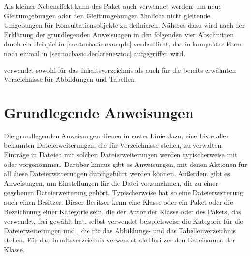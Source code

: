 Als kleiner Nebeneffekt kann das Paket auch verwendet werden, um neue
Gleitumgebungen oder den Gleitumgebungen ähnliche nicht gleitende Umgebungen
für Konsultationsobjekte zu definieren. Näheres dazu wird nach der Erklärung
der grundlegenden Anweisungen in den folgenden vier Abschnitten durch ein
Beispiel in \autoref{sec:tocbasic.example} verdeutlicht, das in kompakter Form
noch einmal in \autoref{sec:tocbasic.declarenewtoc} aufgegriffen wird.

\KOMAScript{} verwendet  sowohl für das Inhaltsverzeichnis
als auch für die bereits erwähnten Verzeichnisse für Abbildungen und Tabellen.


\section{Grundlegende Anweisungen}

Die grundlegenden Anweisungen dienen in erster Linie dazu, eine Liste aller
bekannten Dateierweiterungen, die für
Verzeichnisse stehen, zu verwalten. Einträge in Dateien mit solchen
Dateierweiterungen werden typischerweise mit
 oder
 vorgenommen. Darüber hinaus gibt es
Anweisungen, mit denen Aktionen für all diese Dateierweiterungen durchgeführt
werden können. Außerdem gibt es Anweisungen, um Einstellungen für die Datei
vorzunehmen, die zu einer gegebenen Dateierweiterung gehört. Typischerweise
hat so eine Dateierweiterung auch einen
Besitzer. Dieser Besitzer kann eine Klasse oder ein
Paket oder die Bezeichnung einer Kategorie sein, die der Autor der Klasse oder
des Pakets, das  verwendet, frei gewählt hat. \KOMAScript{}
selbst verwendet beispielsweise die Kategorie  für die
Dateierweiterungen  und , die für das Abbildungs- und das
Tabellenverzeichnis stehen. Für das Inhaltsverzeichnis verwendet \KOMAScript{}
als Besitzer den Dateinamen der Klasse.

